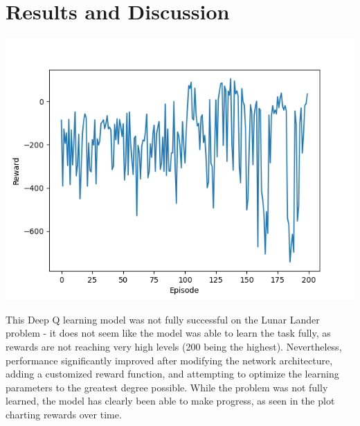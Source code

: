 \documentclass[11pt]{article}
\begin{document}
\section{Results and Discussion}

\includegraphics[scale=0.5]{RewardByEpisode}

\vspace{5mm}

This Deep Q learning model was not fully successful on the Lunar Lander problem - it does not seem like the model was able to learn the task fully, as rewards are not reaching very high levels (200 being the highest).
Nevertheless, performance significantly improved after modifying the network architecture, adding a customized reward function, and attempting to optimize the learning parameters to the greatest degree possible. While
the problem was not fully learned, the model has clearly been able to make progress, as seen in the plot charting rewards over time.
\end{document}
